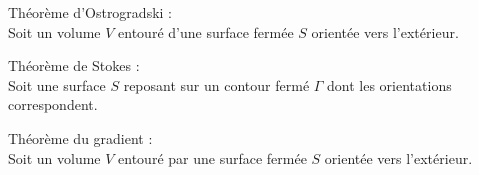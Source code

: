 ﻿\documentclass[a4paper]{article}
\begin{document}
\pagestyle{fancy}
\fancyhf{}
\setlength{\headheight}{15pt}

\begin{center}
	\large{}
\end{center}


Théorème d'Ostrogradski : \\
Soit un volume $V$ entouré d'une surface fermée $S$ orientée vers l'extérieur.
\begin{center}
\end{center}

Théorème de Stokes : \\
Soit une surface $S$ reposant sur un contour fermé $\Gamma$ dont les orientations correspondent.
\begin{center}
\end{center}

Théorème du gradient : \\
Soit un volume $V$ entouré par une surface fermée $S$ orientée vers l'extérieur.
\begin{center}
\end{center}
\end{document}
